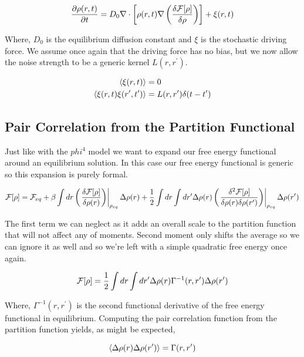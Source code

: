 \begin{equation}
	\frac{\partial \rho(r, t)}{\partial t} = D_0 \nabla \cdot \left[\rho(r,t)\nabla \left(\frac{\delta \mathcal{F}[\rho]}{\delta \rho}\right)\right] + \xi(r, t)
\end{equation}

Where, $D_0$ is the equilibrium diffusion constant and $\xi$ is the stochastic driving force. We assume once again that the driving force has no bias, but we now allow the noise strength to be a generic kernel $L(r, r^\prime)$.

\begin{align}
	\langle \xi(r,t) \rangle &= 0 \\
	\left\langle \xi(r, t) \xi(r^\prime, t^\prime) \right\rangle &= L(r, r^\prime) \delta (t -t^\prime)
\end{align}

\subsection{Pair Correlation from the Partition Functional}

Just like with the $phi^4$ model we want to expand our free energy functional around an equilibrium solution. In this case our free energy functional is generic so this expansion is purely formal.

\begin{equation}
	\mathcal{F}[\rho] = \mathcal{F}_{eq} + \beta\int dr \left(\left.\frac{\delta \mathcal{F}[\rho]}{\delta \rho(r)}\right)\right\vert_{\rho_{eq}}\Delta\rho(r) + \frac{1}{2} \int dr \int dr^\prime \Delta\rho(r) \left(\left.\frac{\delta^2 \mathcal{F}[\rho]}{\delta \rho(r) \delta \rho(r^\prime)}\right)\right\vert_{\rho_{eq}} \Delta\rho(r^\prime)
\end{equation}

The first term we can neglect as it adds an overall scale to the partition function that will not affect any of moments. Second moment only shifts the average so we can ignore it as well and so we're left with a simple quadratic free energy once again.

\begin{equation}
	\mathcal{F}[\rho] = \frac{1}{2}\int dr \int dr^\prime \Delta \rho(r) \Gamma^{-1}(r, r^\prime) \Delta \rho(r^\prime)
\end{equation}

Where, $\Gamma^{-1}(r, r^\prime)$ is the second functional derivative of the free energy functional in equilibrium. Computing the pair correlation function from the partition function yields, as might be expected,

\begin{equation}
	\left\langle \Delta\rho(r) \Delta\rho(r^\prime) \right\rangle = \Gamma(r, r^\prime)
\end{equation}

